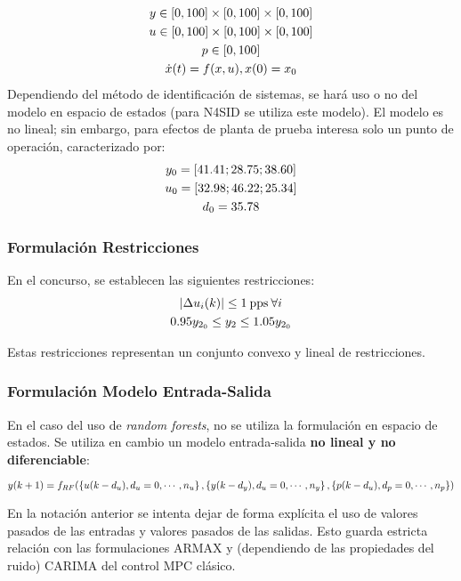 \documentclass{article}
\begin{document}
\bseq{}\label{eq:calderaDims}
\begin{gather}
y \in \left[ 0,100 \right] \times \left[ 0,100 \right] \times \left[ 0,100 \right]\\
u \in \left[ 0,100 \right] \times  \left[ 0,100 \right] \times \left[ 0,100 \right]\\
p \in \left[ 0,100 \right]\\
\dot{x}(t) = f(x,u), x(0) = x_0
\end{gather}
\eseq{}
Dependiendo del método de identificación de sistemas, se hará uso o no del modelo en espacio de estados (para N4SID se utiliza este modelo). El modelo es no lineal; sin embargo, para efectos de planta de prueba interesa solo un punto de operación, caracterizado por:
\bseq{}\label{eq:opPointCaldera}
\begin{gather}
 y_0 = \left[ 41.41 ; 28.75 ;38.60 \right]\\
 u_0 = \left[ 32.98 ; 46.22 ;25.34 \right]\\
 d_0 = 35.78
\end{gather}
\eseq{}

\subsubsection{Formulación Restricciones}
En el concurso, se establecen las siguientes restricciones:
\bseq{}\label{eq:restriccionesCaldera}
\begin{gather}
\left\lvert \Delta u_i(k) \right\rvert \leq 1 \:\text{pps} \: \forall i\\
 0.95y_{2_0} \leq y_2 \leq 1.05y_{2_0}
\end{gather}
\eseq{}

Estas restricciones representan un conjunto convexo y lineal de restricciones.

\subsubsection{Formulación Modelo Entrada-Salida}
En el caso del uso de \textit{random forests}, no se utiliza la formulación en espacio de estados. Se utiliza en cambio un modelo entrada-salida \textbf{no lineal y no diferenciable}:

$$y(k+1) = f_{RF}(\left\lbrace u(k-d_u), d_u = {0,\cdots, n_u}   \right\rbrace,\left\lbrace y(k-d_y), d_u = {0,\cdots, n_y} \right\rbrace,\left\lbrace p(k-d_u), d_p = {0,\cdots, n_p} \right\rbrace)$$

En la notación anterior se intenta dejar de forma explícita el uso de valores pasados de las entradas y valores pasados de las salidas. Esto guarda estricta relación con las formulaciones ARMAX y (dependiendo de las propiedades del ruido) CARIMA del control MPC clásico.
\end{document}
